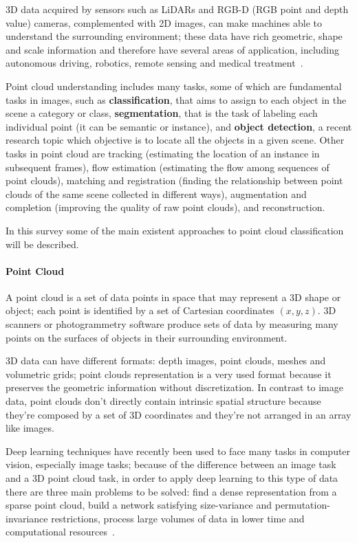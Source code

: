3D data acquired by sensors such as LiDARs and RGB-D (RGB point and depth value) cameras, complemented with 2D images, can make machines able to understand the surrounding environment; these data have rich geometric, shape and scale information and therefore have several areas of application, including autonomous driving, robotics, remote sensing and medical treatment~\cite{guo2020deep}.

Point cloud understanding includes many tasks, some of which are fundamental tasks in images, such as \textbf{classification}, that aims to assign to each object in the scene a category or class, \textbf{segmentation}, that is the task of labeling each individual point (it can be semantic or instance), and \textbf{object detection}, a recent research topic which objective is to locate all the objects in a given scene. Other tasks in point cloud are tracking (estimating the location of an instance in subsequent frames), flow estimation (estimating the flow among sequences of point clouds), matching and registration (finding the relationship between point clouds of the same scene collected in different ways), augmentation and completion (improving the quality of raw point clouds), and reconstruction.

In this survey some of the main existent approaches to point cloud classification will be described.

\paragraph{Point Cloud}

A point cloud is a set of data points in space that may represent a 3D shape or object; each point is identified by a set of Cartesian coordinates $(x,y,z)$. 3D scanners or photogrammetry software produce sets of data by measuring many points on the surfaces of objects in their surrounding environment.

3D data can have different formats: depth images, point clouds, meshes and volumetric grids; point clouds representation is a very used format because it preserves the geometric information without discretization. In contrast to image data, point clouds don't directly contain intrinsic spatial structure because they're composed by a set of 3D coordinates and they're not arranged in an array like images.

Deep learning techniques have recently been used to face many tasks in computer vision, especially image tasks; because of the difference between an image task and a 3D point cloud task, in order to apply deep learning to this type of data there are three main problems to be solved: find a dense representation from a sparse point cloud, build a network satisfying size-variance and permutation-invariance restrictions, process large volumes of data in lower time and computational resources~\cite{lu2020deep}.


